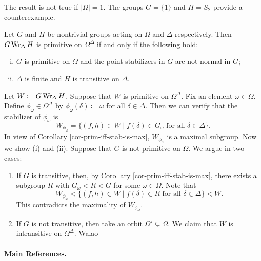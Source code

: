 \begin{remark}
The result is not true if $|\Omega| = 1$. The groups $G=\{1\}$ and $H = S_2$ provide a counterexample.
\end{remark}
\begin{proposition}
	Let $G$ and $H$ be nontrivial groups acting on $\Omega$ and $\Delta$ respectively. Then $G\operatorname{Wr}_{\Delta} H$ is primitive on $\Omega^\Delta$ if and only if the following hold:
\begin{enumerate}[(i)]
	\item $G$ is primitive on $\Omega$ and the point stabilizers in $G$ are not normal in $G$;
	\item $\Delta$ is finite and $H$ is transitive on $\Delta$.
\end{enumerate}
\end{proposition}
\begin{sketch}
	Let $W\coloneq G\operatorname{Wr}_{\Delta} H$. Suppose that $W$ is primitive on $\Omega^\Delta$. Fix an element $\omega\in\Omega$. Define $\phi_\omega\in \Omega^\Delta$ by $\phi_\omega(\delta) \coloneq \omega$ for all $\delta\in \Delta$. Then we can verify that the stabilizer of $\phi_{\omega}$ is 
	\begin{equation*}
		W_{\phi_{\omega}} = \{(f,h)\in W\mid f(\delta)\in G_\omega \text{ for all }\delta\in\Delta\}.
	\end{equation*}
	In view of Corollary \ref{cor-prim-iff-stab-is-max}, $W_{\phi_{\omega}}$ is a maximal subgroup.
Now we show (i) and (ii). Suppose that $G$ is not primitive on $\Omega$. We argue in two cases:
\begin{enumerate}[(1)]
	\item If $G$ is transitive, then, by Corollary \ref{cor-prim-iff-stab-is-max}, there exists a subgroup $R$ with $G_\omega< R < G$ for some $\omega\in\Omega$. Note that 
	\begin{equation*}
		W_{\phi_{\omega}} < \{(f,h)\in W\mid f(\delta)\in R \text{ for all }\delta\in\Delta\} < W.
	\end{equation*}
This contradicts the maximality of $W_{\phi_\omega}$.
	\item If $G$ is not transitive, then take an orbit $\Omega'\subsetneq \Omega$. We claim that $W$ is intransitive on $\Omega^\Delta$. Walao
\end{enumerate}
\end{sketch}

\paragraph{Main References.} \cite{Meldrum1995,Praeger2018,Dixon1996}
